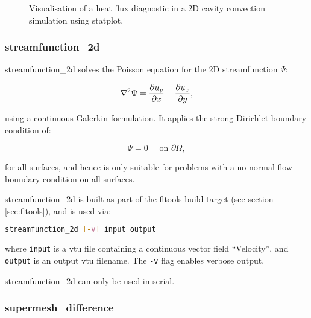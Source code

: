 \begin{figure}[ht]
  \centering
  \caption{Visualisation of a heat flux diagnostic in a 2D cavity convection
           simulation using statplot.}
  \label{fig:statplot}
\end{figure}


\subsubsection{streamfunction\_2d}
\label{sec:streamfunction_2d}

streamfunction\_2d solves the Poisson equation for the 2D streamfunction $\Psi$:

\begin{equation}
\nabla^2 \Psi = \ppx{u_y} - \ppx[y]{u_x},
\end{equation}

using a continuous Galerkin formulation. It applies the strong Dirichlet
boundary condition of:

\begin{equation}
\Psi = 0 \quad \text{ on } \partial \Omega,
\end{equation}

for all surfaces, and hence is only suitable for problems with a no normal flow boundary
condition on all surfaces.

streamfunction\_2d is built as part of the fltools build target (see section \ref{sec:fltools}),
and is used via:

\begin{lstlisting}[language = Bash]
streamfunction_2d [-v] input output
\end{lstlisting}

where \lstinline[language = Bash]+input+ is a vtu file containing a continuous vector
field ``Velocity'', and \lstinline[language = Bash]+output+ is an output vtu filename. The
\lstinline[language = Bash]+-v+ flag enables verbose output.

streamfunction\_2d can only be used in serial.


\subsubsection{supermesh\_difference}
\label{sec:supermesh_difference}

